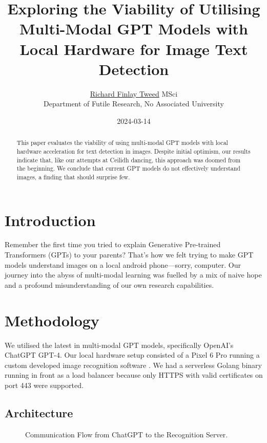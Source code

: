 \documentclass[12pt]{article}
\title{Exploring the Viability of Utilising Multi-Modal GPT Models with Local Hardware for Image Text Detection}
\author{\href{mailto:talesfromprod+sigbovik2024@gmail.com}{Richard Finlay Tweed} MSci\\ Department of Futile Research, No Associated University}
\date{2024-03-14}
\begin{document}
\maketitle

\begin{abstract}
This paper evaluates the viability of using multi-modal GPT models with local hardware acceleration for text detection in images. Despite initial optimism, our results indicate that, like our attempts at Ceilidh dancing, this approach was doomed from the beginning. We conclude that current GPT models do not effectively understand images, a finding that should surprise few.
\end{abstract}

\section{Introduction}
Remember the first time you tried to explain Generative Pre-trained Transformers (GPTs)\cite{radford2018improving} to your parents? That's how we felt trying to make GPT models understand images on a local android phone—sorry, computer. Our journey into the abyss of multi-modal learning was fuelled by a mix of naive hope and a profound misunderstanding of our own research capabilities.

\section{Methodology}
We utilised the latest in multi-modal GPT models, specifically OpenAI's ChatGPT GPT-4. Our local hardware setup consisted of a Pixel 6 Pro running a custom developed image recognition software \cite{Tweed_TextRecogServer}. We had a serverless Golang binary \cite{Tweed_ImagePassthroughServer} running in front as a load balancer because only HTTPS with valid certificates on port 443 were supported.

\subsection{Architecture}

\begin{minipage}{\textwidth}
\begin{figure}[H]
\centering
{}
\caption{Communication Flow from ChatGPT to the Recognition Server.}
\end{figure}

\end{minipage}
\end{document}
